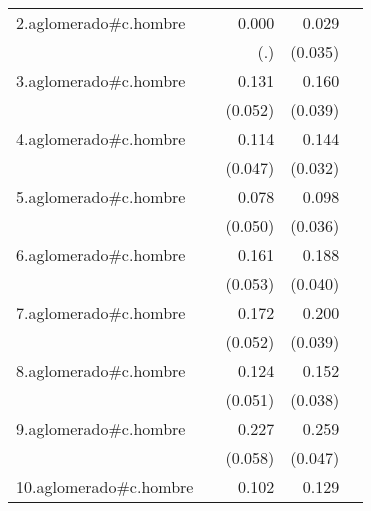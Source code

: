 {\begin{longtable}{l*{4}{D{.}{.}{-1}}}
\addlinespace
2.aglomerado#c.hombre&                     &       0.000         &       0.029         &                     \\
            &                     &         (.)         &     (0.035)         &                     \\
\addlinespace
3.aglomerado#c.hombre&                     &       0.131\sym{*}  &       0.160\sym{***}&                     \\
            &                     &     (0.052)         &     (0.039)         &                     \\
\addlinespace
4.aglomerado#c.hombre&                     &       0.114\sym{*}  &       0.144\sym{***}&                     \\
            &                     &     (0.047)         &     (0.032)         &                     \\
\addlinespace
5.aglomerado#c.hombre&                     &       0.078         &       0.098\sym{**} &                     \\
            &                     &     (0.050)         &     (0.036)         &                     \\
\addlinespace
6.aglomerado#c.hombre&                     &       0.161\sym{**} &       0.188\sym{***}&                     \\
            &                     &     (0.053)         &     (0.040)         &                     \\
\addlinespace
7.aglomerado#c.hombre&                     &       0.172\sym{***}&       0.200\sym{***}&                     \\
            &                     &     (0.052)         &     (0.039)         &                     \\
\addlinespace
8.aglomerado#c.hombre&                     &       0.124\sym{*}  &       0.152\sym{***}&                     \\
            &                     &     (0.051)         &     (0.038)         &                     \\
\addlinespace
9.aglomerado#c.hombre&                     &       0.227\sym{***}&       0.259\sym{***}&                     \\
            &                     &     (0.058)         &     (0.047)         &                     \\
\addlinespace
10.aglomerado#c.hombre&                     &       0.102\sym{*}  &       0.129\sym{***}&                     \\

\end{longtable}}
